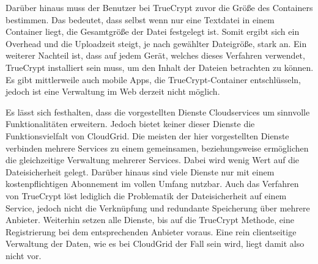 Darüber hinaus muss der Benutzer bei TrueCrypt zuvor die Größe des Containers bestimmen.
Das bedeutet, dass selbst wenn nur eine Textdatei in einem Container liegt, die Gesamtgröße der Datei festgelegt ist.
Somit ergibt sich ein Overhead und die Uploadzeit steigt, je nach gewählter Dateigröße, stark an.
Ein weiterer Nachteil ist, dass auf jedem Gerät, welches dieses Verfahren verwendet, TrueCrypt installiert sein muss, um den Inhalt der Dateien betrachten zu können.
Es gibt mittlerweile auch mobile \acp{App}, die TrueCrypt-Container entschlüsseln, jedoch ist eine Verwaltung im Web derzeit nicht möglich.

Es lässt sich festhalten, dass die vorgestellten Dienste Cloudservices um sinnvolle Funktionalitäten erweitern.
Jedoch bietet keiner dieser Dienste die Funktionsvielfalt von CloudGrid.
Die meisten der hier vorgestellten Dienste verbinden mehrere Services zu einem gemeinsamen, beziehungsweise ermöglichen die gleichzeitige Verwaltung mehrerer Services.
Dabei wird wenig Wert auf die Dateisicherheit gelegt.
Darüber hinaus sind viele Dienste nur mit einem kostenpflichtigen Abonnement im vollen Umfang nutzbar.
Auch das Verfahren von TrueCrypt löst lediglich die Problematik der Dateisicherheit auf einem Service, jedoch nicht die Verknüpfung und redundante Speicherung über mehrere Anbieter.
Weiterhin setzen alle Dienste, bis auf die TrueCrypt Methode, eine Registrierung bei dem entsprechenden Anbieter voraus.
Eine rein clientseitige Verwaltung der Daten, wie es bei CloudGrid der Fall sein wird, liegt damit also nicht vor.